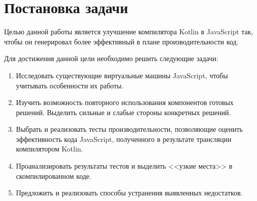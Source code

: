\chapter{Постановка задачи}

Целью данной работы является улучшение компилятора Kotlin в JavaScript так, чтобы он генерировал более эффективный в плане производительности код.

Для достижения данной цели необходимо решить следующие задачи:
\begin{enumerate}
\item Исследовать существующие виртуальные машины JavaScript, чтобы учитывать особенности их работы.
\item Изучить возможность повторного использования компонентов готовых решений. Выделить сильные и слабые стороны конкретных решений.
\item Выбрать и реализовать тесты производительности, позволяющие оценить эффективность кода JavaScript,
полученного в результате трансляции компилятором Kotlin.
\item Проанализировать результаты тестов и выделить <<узкие места>> в скомпилированном коде.
\item Предложить и реализовать способы устранения выявленных недостатков.
\end{enumerate}